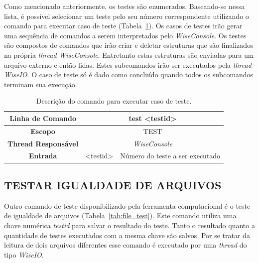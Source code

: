 Como mencionado anteriormente, os testes são enumerados. Baseando-se nessa lista, é possível selecionar um teste pelo seu número correspondente utilizando o comando para executar caso de teste (Tabela~\ref{tab:case_test}). Os casos de testes irão gerar uma sequência de comandos a serem interpretados pelo \textit{WiseConsole}. Os testes são compostos de comandos que irão criar e deletar estruturas que são finalizados na própria \textit{thread} \textit{WiseConsole}. Entretanto estas estruturas são enviadas para um arquivo externo e então lidas. Estes subcomandos irão ser executados pela \textit{thread} \textit{WiseIO}. O caso de teste só é dado como concluído quando todos os subcomandos terminam sua execução.

\begin{center}
	\begin{table}[!htbp]
		\begin{tabularx}{\textwidth}{c|c|X}
			\toprule
			\textbf{Linha de Comando} & \multicolumn{2}{c}{test <test\underline{\space}id>} \\
			\midrule
			\textbf{Escopo} & \multicolumn{2}{c}{TEST} \\
			\hline
			\textbf{Thread Responsável} & \multicolumn{2}{c}{\textit{WiseConsole}} \\
			\hline
			\textbf{Entrada} & <test\underline{\space}id> & Número do teste a ser executado \\
			\bottomrule
		\end{tabularx}
		\caption{Descrição do comando para executar caso de teste.}
		\label{tab:case_test}
	\end{table}
\end{center}

\subsection{TESTAR IGUALDADE DE ARQUIVOS}\label{sec:test_file}

Outro comando de teste disponibilizado pela ferramenta computacional é o teste de igualdade de arquivos (Tabela~\ref{tab:file_test}). Este comando utiliza uma chave numérica \textit{test\underline{\space}id} para salvar o resultado do teste. Tanto o resultado quanto a quantidade de testes executados com a mesma chave são salvos. Por se tratar da leitura de dois arquivos diferentes esse comando é executado por uma \textit{thread} do tipo \textit{WiseIO}.

